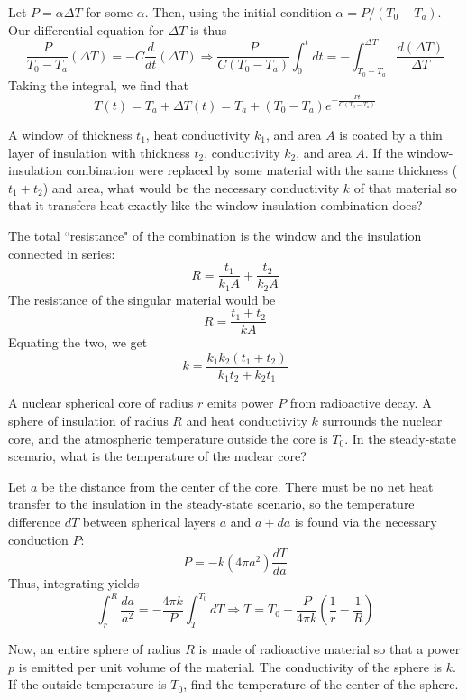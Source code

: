 \documentclass[11pt]{scrartcl}
\begin{document}
\begin{sol}
    Let $P=\alpha \Delta T$ for some $\alpha$. Then, using the initial condition $\alpha=P/(T_0-T_a)$. Our differential equation for $\Delta T$ is thus $$\frac{P}{T_0-T_a}(\Delta T)=-C\frac{d}{dt}(\Delta T)\Rightarrow \frac{P}{C(T_0-T_a)}\int_0^tdt=-\int_{T_0-T_a}^{\Delta T}\frac{d(\Delta T)}{\Delta T}$$Taking the integral, we find that $$T(t)=T_a+\Delta T(t)=\boxed{T_a+(T_0-T_a)e^{-\frac{Pt}{C(T_0-T_a)}}}$$
\end{sol}

\begin{prob}
    A window of thickness $t_1$, heat conductivity $k_1$, and area $A$ is coated by a thin layer of insulation with thickness $t_2$, conductivity $k_2$, and area $A$. If the window-insulation combination were replaced by some material with the same thickness ($t_1+t_2$) and area, what would be the necessary conductivity $k$ of that material so that it transfers heat exactly like the window-insulation combination does? 
\end{prob}

\begin{sol}
    The total ``resistance" of the combination is the window and the insulation connected in series: $$R=\frac{t_1}{k_1A}+\frac{t_2}{k_2A}$$ The resistance of the singular material would be $$R=\frac{t_1+t_2}{kA}$$Equating the two, we get $$k=\boxed{\frac{k_1k_2(t_1+t_2)}{k_1t_2+k_2t_1}}$$
\end{sol}

\begin{prob}
    A nuclear spherical core of radius $r$ emits power $P$ from radioactive decay. A sphere of insulation of radius $R$ and heat conductivity $k$ surrounds the nuclear core, and the atmospheric temperature outside the core is $T_0$. In the steady-state scenario, what is the temperature of the nuclear core?
\end{prob}

\begin{sol}
    Let $a$ be the distance from the center of the core. There must be no net heat transfer to the insulation in the steady-state scenario, so the temperature difference $dT$ between spherical layers $a$ and $a+da$ is found via the necessary conduction $P$: $$P=-k(4\pi a^2)\frac{dT}{da}$$ Thus, integrating yields $$\int_r^R\frac{da}{a^2}=-\frac{4\pi k}{P}\int_T^{T_0}dT\Rightarrow T=\boxed{T_0+\frac{P}{4\pi k}\left(\frac1r-\frac1R\right)}$$
\end{sol}

\begin{prob}
    Now, an entire sphere of radius $R$ is made of radioactive material so that a power $p$ is emitted per unit volume of the material. The conductivity of the sphere is $k$. If the outside temperature is $T_0$, find the temperature of the center of the sphere. 
\end{prob}
\end{document}
